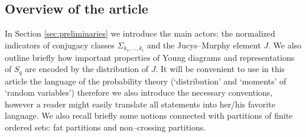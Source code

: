 \documentclass[12pt,dvips]{amsart}
\numberwithin{equation}{section} \numberwithin{figure}{section}
\theoremstyle{plain}
\theoremstyle{definition}
\theoremstyle{remark}
\newcommand{\Sn}[1]{{{S}}_{#1}}
\begin{document}
%
%
%










\subsection{Overview of the article}
In Section \ref{sec:preliminaries} we introduce the main actors: the
normalized indicators of conjugacy classes $\Sigma_{k_1,\dots,k_l}$
and the Jucys--Murphy element $J$. We also outline briefly how
important properties of Young diagrams and representations of
$\Sn{q}$ are encoded by the distribution of $J$. It will be
convenient to use in this article  the language of the probability
theory (`distribution' and `moments' of `random variables')
therefore we also introduce the necessary conventions, however a
reader might easily translate all statements into her/his favorite
language. We also recall briefly some notions connected with
partitions of finite ordered sets: fat partitions and non--crossing
partitions.
\end{document}
